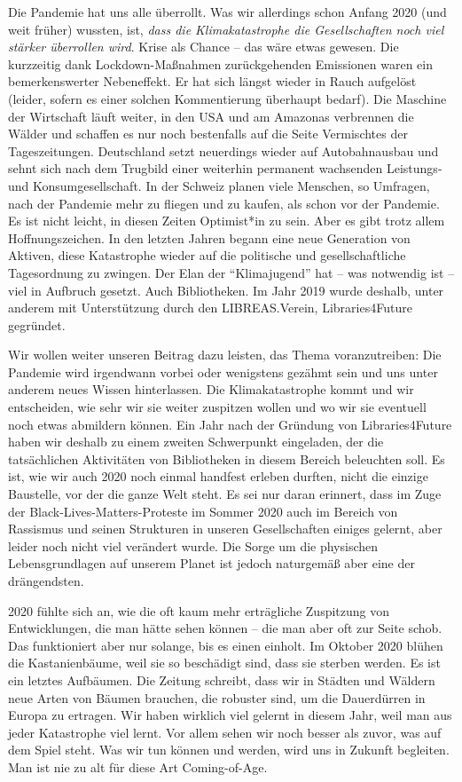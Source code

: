 \documentclass[a4paper,
fontsize=11pt,
oneside,
numbers=noperiodatend,
parskip=half-,
bibliography=totoc,
final
]{scrartcl}
\begin{document}
Die Pandemie hat uns alle überrollt. Was wir allerdings schon Anfang
2020 (und weit früher) wussten, ist, \emph{dass die Klimakatastrophe die
Gesellschaften noch viel stärker überrollen wird}. Krise als Chance --
das wäre etwas gewesen. Die kurzzeitig dank Lockdown-Maßnahmen
zurückgehenden Emissionen waren ein bemerkenswerter Nebeneffekt. Er hat
sich längst wieder in Rauch aufgelöst (leider, sofern es einer solchen
Kommentierung überhaupt bedarf). Die Maschine der Wirtschaft läuft
weiter, in den USA und am Amazonas verbrennen die Wälder und schaffen es
nur noch bestenfalls auf die Seite Vermischtes der Tageszeitungen.
Deutschland setzt neuerdings wieder auf Autobahnausbau und sehnt sich
nach dem Trugbild einer weiterhin permanent wachsenden Leistungs- und
Konsumgesellschaft. In der Schweiz planen viele Menschen, so Umfragen,
nach der Pandemie mehr zu fliegen und zu kaufen, als schon vor der
Pandemie. Es ist nicht leicht, in diesen Zeiten Optimist*in zu sein.
Aber es gibt trotz allem Hoffnungszeichen. In den letzten Jahren begann
eine neue Generation von Aktiven, diese Katastrophe wieder auf die
politische und gesellschaftliche Tagesordnung zu zwingen. Der Elan der
\enquote{Klimajugend} hat -- was notwendig ist -- viel in Aufbruch
gesetzt. Auch Bibliotheken. Im Jahr 2019 wurde deshalb, unter anderem
mit Unterstützung durch den LIBREAS.Verein, Libraries4Future gegründet.

Wir wollen weiter unseren Beitrag dazu leisten, das Thema
voranzutreiben: Die Pandemie wird irgendwann vorbei oder wenigstens
gezähmt sein und uns unter anderem neues Wissen hinterlassen. Die
Klimakatastrophe kommt und wir entscheiden, wie sehr wir sie weiter
zuspitzen wollen und wo wir sie eventuell noch etwas abmildern können.
Ein Jahr nach der Gründung von Libraries4Future haben wir deshalb zu
einem zweiten Schwerpunkt eingeladen, der die tatsächlichen Aktivitäten
von Bibliotheken in diesem Bereich beleuchten soll. Es ist, wie wir auch
2020 noch einmal handfest erleben durften, nicht die einzige Baustelle,
vor der die ganze Welt steht. Es sei nur daran erinnert, dass im Zuge
der Black-Lives-Matters-Proteste im Sommer 2020 auch im Bereich von
Rassismus und seinen Strukturen in unseren Gesellschaften einiges
gelernt, aber leider noch nicht viel verändert wurde. Die Sorge um die
physischen Lebensgrundlagen auf unserem Planet ist jedoch naturgemäß
aber eine der drängendsten.

2020 fühlte sich an, wie die oft kaum mehr erträgliche Zuspitzung von
Entwicklungen, die man hätte sehen können -- die man aber oft zur Seite
schob. Das funktioniert aber nur solange, bis es einen einholt. Im
Oktober 2020 blühen die Kastanienbäume, weil sie so beschädigt sind,
dass sie sterben werden. Es ist ein letztes Aufbäumen. Die Zeitung
schreibt, dass wir in Städten und Wäldern neue Arten von Bäumen
brauchen, die robuster sind, um die Dauerdürren in Europa zu ertragen.
Wir haben wirklich viel gelernt in diesem Jahr, weil man aus jeder
Katastrophe viel lernt. Vor allem sehen wir noch besser als zuvor, was
auf dem Spiel steht. Was wir tun können und werden, wird uns in Zukunft
begleiten. Man ist nie zu alt für diese Art Coming-of-Age.
\end{document}
